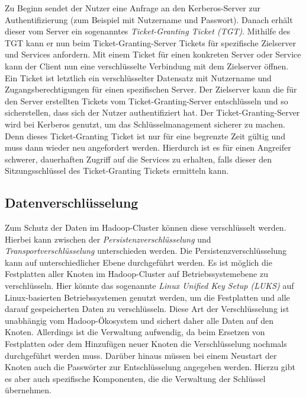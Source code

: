 \noindent
Zu Beginn sendet der Nutzer eine Anfrage an den Kerberos-Server zur Authentifizierung (zum Beispiel mit Nutzername und Passwort). Danach erhält dieser vom Server ein sogenanntes \textit{Ticket-Granting Ticket (TGT)}. Mithilfe des TGT kann er nun beim Ticket-Granting-Server Tickets für spezifische Zielserver und Services anfordern. Mit einem Ticket für einen konkreten Server oder Service kann der Client nun eine verschlüsselte Verbindung mit dem Zielserver öffnen.\\
Ein Ticket ist letztlich ein verschlüsselter Datensatz mit Nutzername und Zugangsberechtigungen für einen spezifischen Server. Der Zielserver kann die für den Server erstellten Tickets vom Ticket-Granting-Server entschlüsseln und so sicherstellen, dass sich der Nutzer authentifiziert hat. Der Ticket-Granting-Server wird bei Kerberos genutzt, um das Schlüsselmanagement sicherer zu machen. Denn dieses Ticket-Granting Ticket ist nur für eine begrenzte Zeit gültig und muss dann wieder neu angefordert werden. Hierdurch ist es für einen Angreifer schwerer, dauerhaften Zugriff auf die Services zu erhalten, falls dieser den Sitzungsschlüssel des Ticket-Granting Tickets ermitteln kann.\cite[S. 425-429]{crypto}\\


\subsection{Datenverschlüsselung}
Zum Schutz der Daten im Hadoop-Cluster können diese verschlüsselt werden. Hierbei kann zwischen der \textit{Persistenzverschlüsselung} und \textit{Transportverschlüsselung} unterschieden werden. Die Persistenzverschlüsselung kann auf unterschiedlicher Ebene durchgeführt werden. Es ist möglich die Festplatten aller Knoten im Hadoop-Cluster auf Betriebssystemebene zu verschlüsseln. Hier könnte das sogenannte \textit{Linux Unified Key Setup (LUKS)} auf Linux-basierten Betriebssystemen genutzt werden, um die Festplatten und alle darauf gespeicherten Daten zu verschlüsseln. Diese Art der Verschlüsselung ist unabhängig vom Hadoop-Ökosystem und sichert daher alle Daten auf den Knoten. Allerdings ist die Verwaltung aufwendig, da beim Ersetzen von Festplatten oder dem Hinzufügen neuer Knoten die Verschlüsselung nochmals durchgeführt werden muss. Darüber hinaus müssen bei einem Neustart der Knoten auch die Passwörter zur Entschlüsselung angegeben werden. Hierzu gibt es aber auch spezifische Komponenten, die die Verwaltung der Schlüssel übernehmen. \cite[S. 202-204]{hadoop_security}\\

